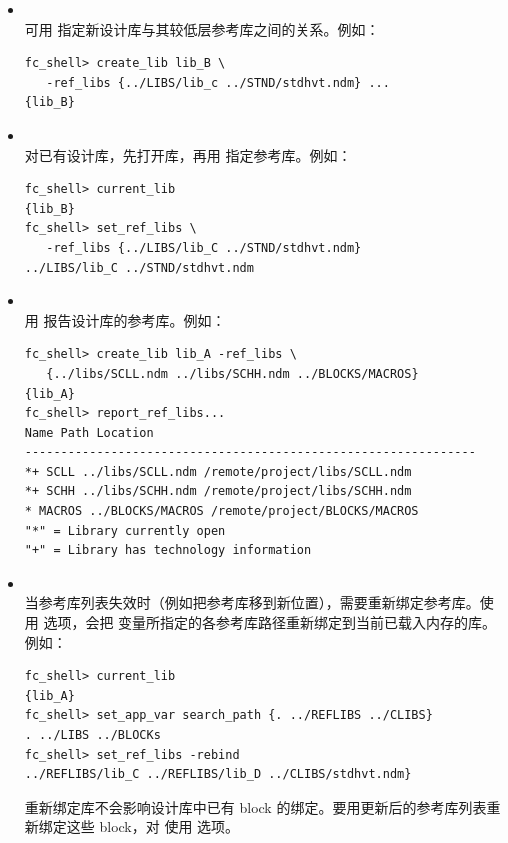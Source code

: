 \begin{itemize}
  \item {}\\
    可用  指定新设计库与其较低层参考库之间的关系。例如：
\begin{lstlisting}
fc_shell> create_lib lib_B \
   -ref_libs {../LIBS/lib_c ../STND/stdhvt.ndm} ...
{lib_B}
\end{lstlisting}

  \item {}\\
    对已有设计库，先打开库，再用  指定参考库。例如：
\begin{lstlisting}
fc_shell> current_lib
{lib_B}
fc_shell> set_ref_libs \
   -ref_libs {../LIBS/lib_C ../STND/stdhvt.ndm}
../LIBS/lib_C ../STND/stdhvt.ndm
\end{lstlisting}

  \item {}\\
    用  报告设计库的参考库。例如：
\begin{lstlisting}
fc_shell> create_lib lib_A -ref_libs \
   {../libs/SCLL.ndm ../libs/SCHH.ndm ../BLOCKS/MACROS}
{lib_A}
fc_shell> report_ref_libs...
Name Path Location
---------------------------------------------------------------
*+ SCLL ../libs/SCLL.ndm /remote/project/libs/SCLL.ndm
*+ SCHH ../libs/SCHH.ndm /remote/project/libs/SCHH.ndm
* MACROS ../BLOCKS/MACROS /remote/project/BLOCKS/MACROS
"*" = Library currently open
"+" = Library has technology information
\end{lstlisting}

  \item {}\\
    当参考库列表失效时（例如把参考库移到新位置），需要重新绑定参考库。使用  选项，会把  变量所指定的各参考库路径重新绑定到当前已载入内存的库。例如：
\begin{lstlisting}
fc_shell> current_lib
{lib_A}
fc_shell> set_app_var search_path {. ../REFLIBS ../CLIBS}
. ../LIBS ../BLOCKs
fc_shell> set_ref_libs -rebind
../REFLIBS/lib_C ../REFLIBS/lib_D ../CLIBS/stdhvt.ndm}
\end{lstlisting}

    重新绑定库不会影响设计库中已有 block 的绑定。要用更新后的参考库列表重新绑定这些 block，对  使用  选项。
\end{itemize}

